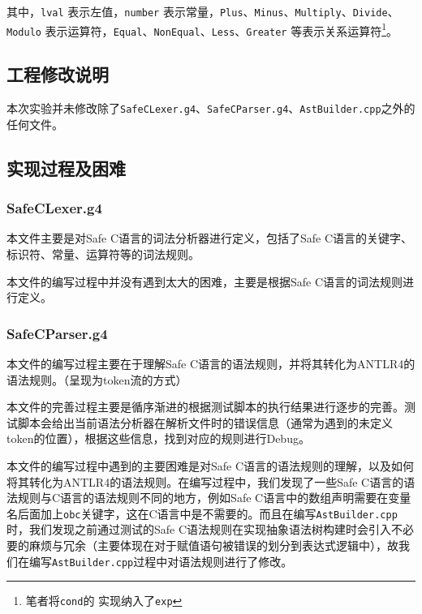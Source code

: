 \documentclass[../main.tex]{subfiles}
\begin{document}
其中，\texttt{lval} 表示左值，\texttt{number} 表示常量，\texttt{Plus}、\texttt{Minus}、\texttt{Multiply}、\texttt{Divide}、\texttt{Modulo} 表示运算符，\texttt{Equal}、\texttt{NonEqual}、\texttt{Less}、\texttt{Greater} 等表示关系运算符\footnote{笔者将\texttt{cond}的 实现纳入了\texttt{exp}}。


\songti
\subsection{工程修改说明}

本次实验并未修改除了\texttt{SafeCLexer.g4}、\texttt{SafeCParser.g4}、\texttt{AstBuilder.cpp}之外的任何文件。

\subsection{实现过程及困难}

\subsubsection{SafeCLexer.g4}

本文件主要是对Safe C语言的词法分析器进行定义，包括了Safe C语言的关键字、标识符、常量、运算符等的词法规则。

本文件的编写过程中并没有遇到太大的困难，主要是根据Safe C语言的词法规则进行定义。

\subsubsection{SafeCParser.g4}

本文件的编写过程主要在于理解Safe C语言的语法规则，并将其转化为ANTLR4的语法规则。（呈现为token流的方式）

本文件的完善过程主要是循序渐进的根据测试脚本的执行结果进行逐步的完善。测试脚本会给出当前语法分析器在解析文件时的错误信息（通常为遇到的未定义token的位置），根据这些信息，找到对应的规则进行Debug。


本文件的编写过程中遇到的主要困难是对Safe C语言的语法规则的理解，以及如何将其转化为ANTLR4的语法规则。在编写过程中，我们发现了一些Safe C语言的语法规则与C语言的语法规则不同的地方，例如Safe C语言中的数组声明需要在变量名后面加上\texttt{obc}关键字，这在C语言中是不需要的。而且在编写\texttt{AstBuilder.cpp}时，我们发现之前通过测试的Safe C语法规则在实现抽象语法树构建时会引入不必要的麻烦与冗余（主要体现在对于赋值语句被错误的划分到表达式逻辑中），故我们在编写\texttt{AstBuilder.cpp}过程中对语法规则进行了修改。
\end{document}
